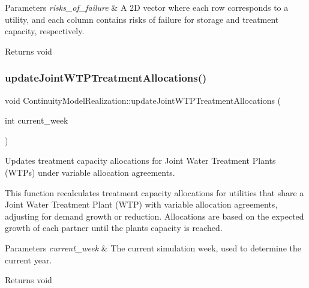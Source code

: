\begin{DoxyParams}{Parameters}
{\em risks\+\_\+of\+\_\+failure} & A 2D vector where each row corresponds to a utility, and each column contains risks of failure for storage and treatment capacity, respectively.\\
\hline
\end{DoxyParams}
\begin{DoxyReturn}{Returns}
void 
\end{DoxyReturn}
\mbox{\label{classContinuityModelRealization_ab87c140eaf87266ca81636059e948bb7}} 
\subsubsection{\texorpdfstring{update\+Joint\+W\+T\+P\+Treatment\+Allocations()}{updateJointWTPTreatmentAllocations()}}
{\footnotesize\ttfamily void Continuity\+Model\+Realization\+::update\+Joint\+W\+T\+P\+Treatment\+Allocations (\begin{DoxyParamCaption}\item[{int}]{current\+\_\+week }\end{DoxyParamCaption})}



Updates treatment capacity allocations for Joint Water Treatment Plants (W\+T\+Ps) under variable allocation agreements. 

This function recalculates treatment capacity allocations for utilities that share a Joint Water Treatment Plant (W\+TP) with variable allocation agreements, adjusting for demand growth or reduction. Allocations are based on the expected growth of each partner until the plant\textquotesingle{}s capacity is reached.


\begin{DoxyParams}{Parameters}
{\em current\+\_\+week} & The current simulation week, used to determine the current year.\\
\hline
\end{DoxyParams}
\begin{DoxyReturn}{Returns}
void 
\end{DoxyReturn}


